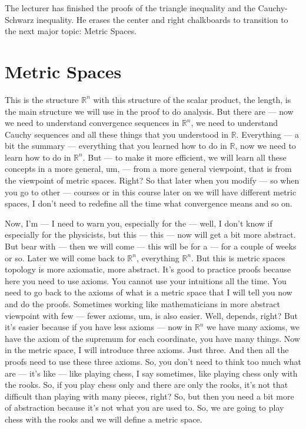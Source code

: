 \begin{meta-note}
The lecturer has finished the proofs of the triangle inequality and the Cauchy-Schwarz inequality. He erases the center and right chalkboards to transition to the next major topic: Metric Spaces.
\end{meta-note}

\section{Metric Spaces}

\begin{spoken-clean}[00:10:30 - 00:12:50]
This is the structure $\mathbb{R}^n$ with this structure of the scalar product, the length, is the main structure we will use in the proof to do analysis. But there are --- now we need to understand convergence sequences in $\mathbb{R}^n$, we need to understand Cauchy sequences and all these things that you understood in $\mathbb{R}$. Everything --- a bit the summary --- everything that you learned how to do in $\mathbb{R}$, now we need to learn how to do in $\mathbb{R}^n$. But --- to make it more efficient, we will learn all these concepts in a more general, um, --- from a more general viewpoint, that is from the viewpoint of metric spaces. Right? So that later when you modify --- so when you go to other --- courses or in this course later on we will have different metric spaces, I don't need to redefine all the time what convergence means and so on.

Now, I'm --- I need to warn you, especially for the --- well, I don't know if especially for the physicists, but this --- this --- now will get a bit more abstract. But bear with --- then we will come --- this will be for a --- for a couple of weeks or so. Later we will come back to $\mathbb{R}^n$, everything $\mathbb{R}^n$. But this is metric spaces topology is more axiomatic, more abstract. It's good to practice proofs because here you need to use axioms. You cannot use your intuitions all the time. You need to go back to the axioms of what is a metric space that I will tell you now and do the proofs. Sometimes working like mathematicians in more abstract viewpoint with few --- fewer axioms, um, is also easier. Well, depends, right? But it's easier because if you have less axioms --- now in $\mathbb{R}^n$ we have many axioms, we have the axiom of the supremum for each coordinate, you have many things. Now in the metric space, I will introduce three axioms. Just three. And then all the proofs need to use these three axioms. So, you don't need to think too much what are --- it's like --- like playing chess, I say sometimes, like playing chess only with the rooks. So, if you play chess only and there are only the rooks, it's not that difficult than playing with many pieces, right? So, but then you need a bit more of abstraction because it's not what you are used to. So, we are going to play chess with the rooks and we will define a metric space.
\end{spoken-clean}

